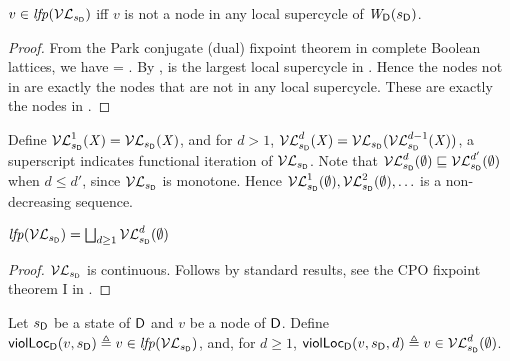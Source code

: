 \begin{proposition} \label{prop:LFPisLocScViolations}
$v \in \mathit{lfp}(\mathcal{VL}_{s_\mathsf{D}})$ iff $v$ is not a node in any local supercycle of $\mathit{W}_{\mathsf{D}}({s_\mathsf{D}})$.
\end{proposition}
%
\begin{proof}
From the Park conjugate (dual) fixpoint theorem in complete Boolean lattices, we have 
\lfp{\VFsymb_{\sD}} = \complLoc{\gfp{\SFsymb_{\sD}}}.
By , \gfp{\SFsymb_{\sD}} is the largest local supercycle in \wfg{\DS}{\sD}. Hence the nodes not in 
\gfp{\SFsymb_{\sD}} are exactly the nodes that are not in any local supercycle. These are exactly the nodes in \lfp{\VFsymb_{\sD}}.
\end{proof}

Define $\mathcal{VL}_{s_\mathsf{D}}^{1}(\mathit{X}) = \mathcal{VL}_{s_\mathsf{D}}(\mathit{X})$, and for $d > 1$, 
$\mathcal{VL}_{s_\mathsf{D}}^{d}(\mathit{X}) = \mathcal{VL}_{s_\mathsf{D}}(\mathcal{VL}_{s_\mathsf{D}}^{d-1}(\mathit{X}))$, \ie a superscript indicates functional iteration of $\mathcal{VL}_{s_\mathsf{D}}$. Note that 
$\mathcal{VL}_{s_\mathsf{D}}^{d}(\emptyset) \sqsubseteq \mathcal{VL}_{s_\mathsf{D}}^{d'}(\emptyset)$ when $d \le d'$, since $\mathcal{VL}_{s_\mathsf{D}}$ is monotone.
Hence $\mathcal{VL}_{s_\mathsf{D}}^{1}(\emptyset), \mathcal{VL}_{s_\mathsf{D}}^{2}(\emptyset), \ldots$ is a non-decreasing sequence.

\begin{proposition} \label{prop:computeLocLFP}
$\mathit{lfp}(\mathcal{VL}_{s_\mathsf{D}}) = \bigsqcup_{d \ge 1} \mathcal{VL}_{s_\mathsf{D}}^{d}(\emptyset)$ 
\end{proposition}
%
\begin{proof}
$\mathcal{VL}_{s_\mathsf{D}}$ is continuous. Follows by standard results, \eg see the CPO fixpoint theorem I in 
\cite{DP02}.
\end{proof}










\begin{definition}
\label{def:supercycle.violation.local}
\label{defn:supercycle.violation.local}
Let $s_\mathsf{D}$ be a state of $\mathsf{D}$ and $v$ be a node of $\mathsf{D}$.
Define 
$\mathsf{violLoc}_{\mathsf{D}}(v,s_\mathsf{D}) \triangleq v \in \mathit{lfp}(\mathcal{VL}_{s_\mathsf{D}})$,
and, for $d \ge 1$, $\mathsf{violLoc}_{\mathsf{D}}(v,s_\mathsf{D},d) \triangleq v \in  \mathcal{VL}_{s_\mathsf{D}}^{d}(\emptyset)$.
\end{definition}


